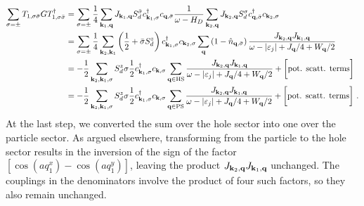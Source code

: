 \documentclass{revtex4-2}
\begin{document}
\begin{equation}\begin{aligned}\label{t1t1h}
	\sum_{\sigma=\pm}T_{1,\sigma\bar\sigma} G T^\dagger_{1,\sigma\bar\sigma} &= \sum_{\sigma=\pm}\frac{1}{4} \sum_{{\bf k}_1,{\bf q}}J_{{\bf k}_1,{\bf q}} S_d^{\bar\sigma} c^\dagger_{{\bf k}_1,\sigma} c_{{\bf q},\bar\sigma} \frac{1}{\omega - H_D}\sum_{{\bf k}_2,{\bf q}}J_{{\bf k}_2,{\bf q}} S_d^\sigma c^\dagger_{{\bf q},\bar\sigma} c_{{\bf k}_2,\sigma}\\
										 &= \sum_{\sigma=\pm}\frac{1}{4}\sum_{{\bf k}_2,{\bf k}_1} \left(\frac{1}{2} + \bar\sigma S_d^z\right) c^\dagger_{{\bf k}_1,\sigma} c_{{\bf k}_2,\sigma} \sum_{{\bf q}} \left(1 - \hat n_{{\bf q},\bar\sigma}\right) \frac{J_{{\bf k}_2,{\bf q}} J_{{\bf k}_1,{\bf q}}}{\omega - |\varepsilon_j| + J_{{\bf q}}/4 + W_{{\bf q}}/2}\\
										 &= -\frac{1}{2}\sum_{{\bf k}_2,{\bf k}_1, \sigma} S_d^z \sigma \frac{1}{2}c^\dagger_{{\bf k}_1,\sigma}c_{{\bf k},\sigma} \sum_{{\bf q} \in \text{HS}} \frac{J_{{\bf k}_2,{\bf q}} J_{{\bf k}_1,{\bf q}}}{\omega - |\varepsilon_j| + J_{{\bf q}}/4 + W_{{\bf q}}/2} + \bigg[\text{pot. scatt. terms}\bigg]\\
										 &= -\frac{1}{2}\sum_{{\bf k}_2,{\bf k}_1, \sigma} S_d^z \sigma \frac{1}{2}c^\dagger_{{\bf k}_1,\sigma}c_{{\bf k},\sigma} \sum_{{\bf q} \in \text{PS}} \frac{J_{{\bf k}_2,{\bf q}} J_{{\bf k}_1,{\bf q}}}{\omega - |\varepsilon_j| + J_{{\bf q}}/4 + W_{{\bf q}}/2} + \bigg[\text{pot. scatt. terms}\bigg]~.
\end{aligned}\end{equation}
At the last step, we converted the sum over the hole sector into one over the particle sector. As argued elsewhere, transforming from the particle to the hole sector results in the inversion of the sign of the factor \(\left[\cos\left( aq_1^x \right) - \cos\left( aq_1^y \right) \right]\), leaving the product \(J_{{\bf k}_2,{\bf q}} J_{{\bf k}_1,{\bf q}}\) unchanged. The couplings in the denominators involve the product of four such factors, so they also remain unchanged.
\end{document}
